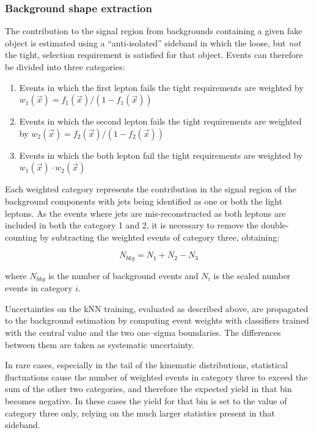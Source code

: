 \subsubsection{Background shape extraction}
The contribution to the signal region from backgrounds containing a given fake object is estimated using a ``anti-isolated'' sideband in which the loose, but \emph{not} the tight, 
selection requirement is satisfied for that object. Events can therefore be divided into three categories:

\begin{enumerate}
\item Events in which the first lepton fails the tight requirements are weighted by $w_1(\vec{x}) = f_1(\vec{x})/(1-f_1(\vec{x}))$
\item Events in which the second lepton fails the tight requirements are weighted by $w_2(\vec{x}) = f_2(\vec{x})/(1-f_2(\vec{x}))$
\item Events in which the both lepton fail the tight requirements are weighted by $w_1(\vec{x}) \cdot w_2(\vec{x})$
\end{enumerate}

Each weighted category represents the contribution in the signal region of the background components with jets being identified as one or both the light leptons. As the events where jets are mis-reconstructed as both leptons are included in both the category 1 and 2, it is necessary to remove the double-counting by subtracting the weighted events of category three, obtaining:

\begin{equation}
N_{bkg} = N_1 + N_2 - N_3
\end{equation}

where $N_{bkg}$ is the number of background events and $N_i$ is the scaled number events in category $i$.

Uncertainties on the kNN training, evaluated as described above, are propagated to the background estimation by computing event weights with classifiers trained with the central value and the two one--sigma boundaries. The differences between them are taken as systematic uncertainty.

In rare cases, especially in the tail of the kinematic distributions, statistical fluctuations cause the number of weighted events in category three to exceed the sum of the other two categories, and therefore the expected yield in that bin becomes negative. In these cases the yield for that bin is set to the value of category three only, relying on the much larger statistics present in that sideband.


